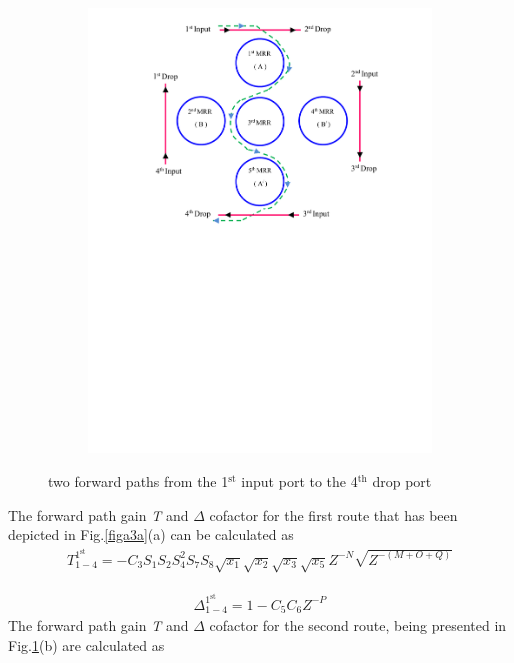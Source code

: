 \documentclass{osa-article}
\begin{document}
\begin{figure}[h!]
\begin{subfigure}[b]{0.4\linewidth}
    \includegraphics[width=\linewidth]{figs/fig3a_142.pdf}
    \caption{}
  \end{subfigure}
  \caption{two forward paths from the 1$^{\text{st}}$ input port to the 4$^{\text{th}}$ drop port}
  \label{fig3a}
\end{figure}

The forward path gain \textit {T} and $\Delta$ cofactor for the first route that has been depicted in Fig.\ref{figa3a}(a) can be calculated as\\

\begin{equation}
\begin{split}
T^{1^{\text{st}}}_{1-4}=-C_3S_1S_2{S^2_{4}}S_7S_8\sqrt{x_1}\sqrt{x_2}\sqrt{x_3}\sqrt{x_5}Z^{-N}\sqrt{Z^{-(M+O+Q)}}
 \label{eqa51}
\end{split}
\end{equation}

\begin{equation}
\begin{split}
\Delta^{1^{\text{st}}}_{1-4}=1-C_5C_6Z^{-P}
 \label{eqa52}
\end{split}
\end{equation}
The forward path gain \textit {T} and $\Delta$ cofactor for the second route, being presented in Fig.\ref{fig3a}(b) are calculated as
\end{document}
